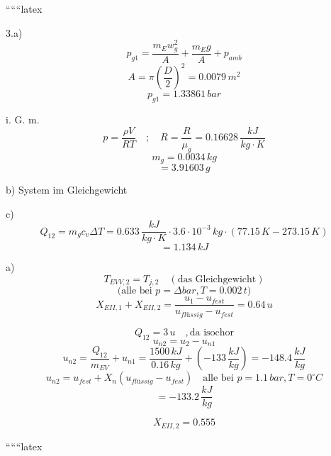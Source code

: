 
``````latex


3.a) 
\[
p_{g1} = \frac{m_{E} w_{g}^2}{A} + \frac{m_{E} g}{A} + p_{amb}
\]
\[
A = \pi \left( \frac{D}{2} \right)^2 = 0.0079 \, m^2
\]
\[
p_{g1} = 1.33861 \, bar
\]

i. G. m. 
\[
p = \frac{\rho V}{RT} \quad ; \quad R = \frac{R}{\mu_{g}} = 0.16628 \, \frac{kJ}{kg \cdot K}
\]
\[
m_{g} = 0.0034 \, kg
\]
\[
= 3.91603 \, g
\]

b) System im Gleichgewicht

c) 
\[
Q_{12} = m_{g} c_{v} \Delta T = 0.633 \, \frac{kJ}{kg \cdot K} \cdot 3.6 \cdot 10^{-3} \, kg \cdot (77.15 \, K - 273.15 \, K)
\]
\[
= 1.134 \, kJ
\]

a) 
\[
T_{EVV,2} = T_{j,2} \quad (\text{das Gleichgewicht})
\]
\[
\text{(alle bei } p = \Delta bar, T = 0.002 \, t)
\]
\[
X_{EII,1} + X_{EII,2} = \frac{u_{1} - u_{fest}}{u_{flüssig} - u_{fest}} = 0.64 \, u
\]

\[
Q_{12} = 3 \, u \quad , \text{da isochor}
\]
\[
u_{n2} = u_{2} - u_{n1}
\]
\[
u_{n2} = \frac{Q_{12}}{m_{EV}} + u_{n1} = \frac{1500 \, kJ}{0.16 \, kg} + (-133 \, \frac{kJ}{kg}) = -148.4 \, \frac{kJ}{kg}
\]
\[
u_{n2} = u_{fest} + X_{n} (u_{flüssig} - u_{fest}) \quad \text{alle bei } p = 1.1 \, bar, T = 0^{\circ}C
\]
\[
= -133.2 \, \frac{kJ}{kg}
\]

\[
X_{EII,2} = 0.555
\]

``````latex


